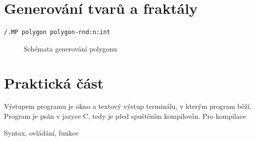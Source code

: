 \documentclass[a4paper,12pt]{book}
\begin{document}








\chapter{Generování tvarů a fraktály}

\begin{lstlisting}
/.MP polygon polygon-rnd:n:int
\end{lstlisting}

\begin{figure}[H]
  \centering
  \hfill
    \hfill
  \caption{Schémata generování polygonu}
  \centering
\end{figure}
 


\chapter{Praktická část}

Výstupem programu je okno a textový výstup terminálu, v kterým program běží.
Program je psán v jazyce C, tedy je před spuštěním kompilován. Pro kompilace 

Syntax, ovládání, funkce
 
\end{document}
